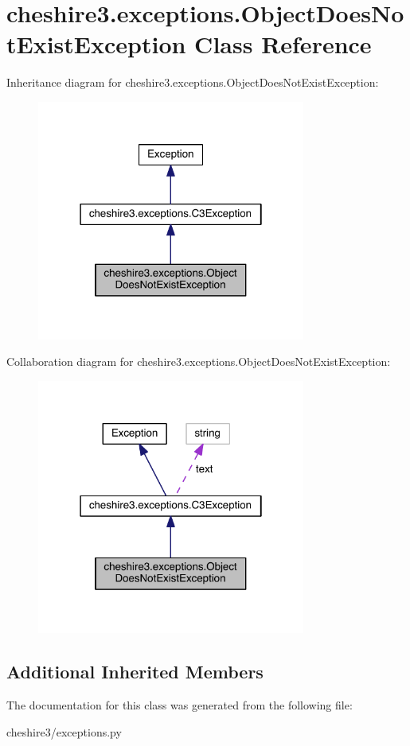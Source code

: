 \hypertarget{classcheshire3_1_1exceptions_1_1_object_does_not_exist_exception}{\section{cheshire3.\-exceptions.\-Object\-Does\-Not\-Exist\-Exception Class Reference}
\label{classcheshire3_1_1exceptions_1_1_object_does_not_exist_exception}
}


Inheritance diagram for cheshire3.\-exceptions.\-Object\-Does\-Not\-Exist\-Exception\-:
\nopagebreak
\begin{figure}[H]
\begin{center}
\leavevmode
\includegraphics[width=250pt]{classcheshire3_1_1exceptions_1_1_object_does_not_exist_exception__inherit__graph}
\end{center}
\end{figure}


Collaboration diagram for cheshire3.\-exceptions.\-Object\-Does\-Not\-Exist\-Exception\-:
\nopagebreak
\begin{figure}[H]
\begin{center}
\leavevmode
\includegraphics[width=250pt]{classcheshire3_1_1exceptions_1_1_object_does_not_exist_exception__coll__graph}
\end{center}
\end{figure}
\subsection*{Additional Inherited Members}


The documentation for this class was generated from the following file\-:\begin{DoxyCompactItemize}
\item 
cheshire3/exceptions.\-py\end{DoxyCompactItemize}
